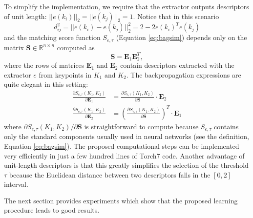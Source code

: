 \documentclass[twocolumn]{article}
\begin{document}
		To simplify the implementation, we require that the extractor outputs descriptors of unit length: $||e(k_i)||_2=||e(k_j)||_2=1$.
		Notice that in this scenario
		$$
			d_{ij}^2=
			|| e(k_i) - e(k_j) ||_2^2 =
			2 - 2e(k_i)^Te(k_j)
		$$
		and the matching score function $S_{e, \tau}$ (Equation \eqref{eq:bagsim}) depends only on the matrix $\mathbf{S}\in\mathbb{R}^{n\times n}$ computed as
		$$
			\mathbf{S}=
			\mathbf{E}_1\mathbf{E}_2^T
			,
		$$
		where the rows of matrices $\mathbf{E}_1$ and $\mathbf{E}_2$ contain descriptors extracted with the extractor $e$ from keypoints in $K_1$ and $K_2$.
		The backpropagation expressions are quite elegant in this setting:
		\begin{align*}
			\frac{\partial S_{e, \tau}(K_1, K_2)}{\partial \mathbf{E}_1}&=\frac{\partial S_{e, \tau}(K_1, K_2)}{\partial \mathbf{S}}\cdot\mathbf{E}_2	\\
			\frac{\partial S_{e, \tau}(K_1, K_2)}{\partial \mathbf{E}_2}&=\left(\frac{\partial S_{e, \tau}(K_1, K_2)}{\partial \mathbf{S}}\right)^T\cdot\mathbf{E}_1
		\end{align*}
		where $\partial S_{e, \tau}(K_1, K_2)/\partial \mathbf{S}$ is straightforward to compute because $S_{e, \tau}$ contains only the standard components usually used in neural networks (see the definition, Equation \eqref{eq:bagsim}).
		The proposed computational steps can be implemented very efficiently in just a few hundred lines of Torch7 code.
		Another advantage of unit-length descriptors is that this greatly simplifies the selection of the threshold $\tau$ because the Euclidean distance between two descriptors falls in the $[0, 2]$ interval.

		The next section provides experiments which show that the proposed learning procedure leads to good results.
\end{document}
